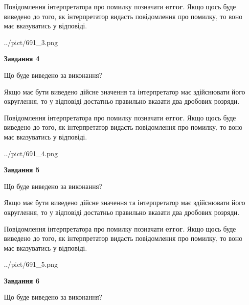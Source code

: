 \documentclass[12pt, ukrainian]{article}
\begin{document}
{\begin {Large}
Повідомлення інтерпретатора про помилку позначати \textbf{error}.
Якщо щось буде виведено до того, як інтерпретатор видасть повідомлення про помилку, 
то воно має вказуватись у відповіді. \par

\begin{center}
	{../pict/691_3.png}
\end{center}
\newpage

{\begin {center}\textbf{Завдання 4}\end {center}}\par
Що буде виведено за виконання? \par

Якщо має бути виведено дійсне значення та інтерпретатор має здійснювати його округлення, 
то у відповіді достатньо правильно вказати два дробових розряди.

Повідомлення інтерпретатора про помилку позначати \textbf{error}.
Якщо щось буде виведено до того, як інтерпретатор видасть повідомлення про помилку, 
то воно має вказуватись у відповіді. \par

\begin{center}
	{../pict/691_4.png}
\end{center}
\newpage

{\begin {center}\textbf{Завдання 5}\end {center}}\par
Що буде виведено за виконання? \par

Якщо має бути виведено дійсне значення та інтерпретатор має здійснювати його округлення, 
то у відповіді достатньо правильно вказати два дробових розряди.

Повідомлення інтерпретатора про помилку позначати \textbf{error}.
Якщо щось буде виведено до того, як інтерпретатор видасть повідомлення про помилку, 
то воно має вказуватись у відповіді. \par

\begin{center}
	{../pict/691_5.png}
\end{center}
\newpage

{\begin {center}\textbf{Завдання 6}\end {center}}\par
Що буде виведено за виконання? \par


\end{Large}}
\end{document}
